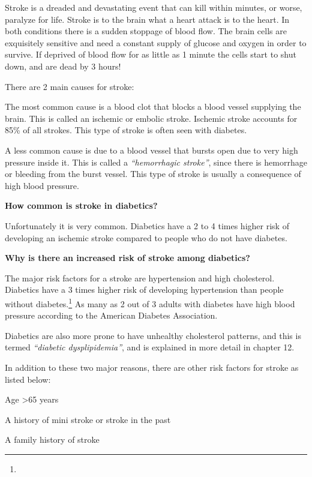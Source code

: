 Stroke is a dreaded and devastating event that can kill within minutes, or worse, paralyze for life. Stroke is to the brain what a heart attack is to the heart. In both conditions there is a sudden stoppage of blood flow. The brain cells are exquisitely sensitive and need a constant supply of glucose and oxygen in order to survive. If deprived of blood flow for as little as 1 minute the cells start to shut down, and are dead by 3 hours!

There are 2 main causes for stroke:

\item The most common cause is a blood clot that blocks a blood vessel supplying the brain. This is called an ischemic or embolic stroke. Ischemic stroke accounts for 85\% of all strokes. This type of stroke is often seen with diabetes.

 \item A less common cause is due to a blood vessel that bursts open due to very high pressure inside it. This is called a \textit{“hemorrhagic stroke”}, since there is hemorrhage or bleeding from the burst vessel. This type of stroke is usually a consequence of high blood pressure.

\textbf{How common is stroke in diabetics?}

Unfortunately it is very common. Diabetics have a 2 to 4 times higher risk of developing an ischemic stroke compared to people who do not have diabetes.

\textbf{Why is there an increased risk of stroke among diabetics?}

The major risk factors for a stroke are hypertension and high cholesterol. Diabetics have a 3 times higher risk of developing hypertension than people without diabetes.\footnote{} As many as 2 out of 3 adults with diabetes have high blood pressure according to the American Diabetes Association.

Diabetics are also more prone to have unhealthy cholesterol patterns, and this is termed \textit{“diabetic dysplipidemia”}, and is explained in more detail in chapter 12.

In addition to these two major reasons, there are other risk factors for stroke as listed below:

\item Age \textgreater  65 years

 \item A history of mini stroke or stroke in the past

 \item A family history of stroke

